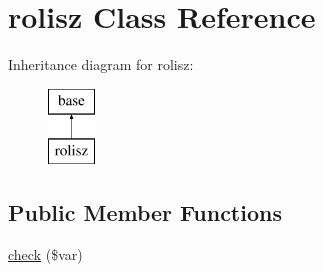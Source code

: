 \hypertarget{classrolisz}{
\section{rolisz Class Reference}
\label{classrolisz}
}
Inheritance diagram for rolisz:\begin{figure}[H]
\begin{center}
\leavevmode
\includegraphics[height=2.000000cm]{classrolisz}
\end{center}
\end{figure}
\subsection*{Public Member Functions}
\begin{DoxyCompactItemize}
\item 
\hyperlink{classrolisz_a1f01a32bc82b862425eba2f6aa0bc0d3}{check} (\$var)
\end{DoxyCompactItemize}

